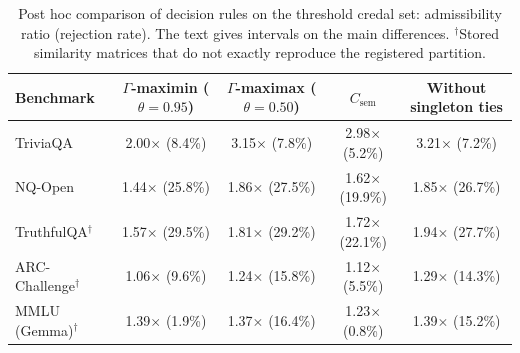 \begin{table}[h]
\centering
\footnotesize
\setlength{\tabcolsep}{4pt}
\begin{tabular}{lcccc}
\toprule
Benchmark & $\Gamma$-maximin ($\theta=0.95$) & $\Gamma$-maximax ($\theta=0.50$) & $C_{\text{sem}}$ & Without singleton ties \\
\midrule
TriviaQA & 2.00$\times$ (8.4\%) & 3.15$\times$ (7.8\%) & 2.98$\times$ (5.2\%) & 3.21$\times$ (7.2\%) \\
NQ-Open & 1.44$\times$ (25.8\%) & 1.86$\times$ (27.5\%) & 1.62$\times$ (19.9\%) & 1.85$\times$ (26.7\%) \\
TruthfulQA$^\dagger$ & 1.57$\times$ (29.5\%) & 1.81$\times$ (29.2\%) & 1.72$\times$ (22.1\%) & 1.94$\times$ (27.7\%) \\
ARC-Challenge$^\dagger$ & 1.06$\times$ (9.6\%) & 1.24$\times$ (15.8\%) & 1.12$\times$ (5.5\%) & 1.29$\times$ (14.3\%) \\
MMLU (Gemma)$^\dagger$ & 1.39$\times$ (1.9\%) & 1.37$\times$ (16.4\%) & 1.23$\times$ (0.8\%) & 1.39$\times$ (15.2\%) \\
\bottomrule
\end{tabular}
\caption{Post hoc comparison of decision rules on the threshold credal set: admissibility ratio (rejection rate). The text gives intervals on the main differences. $^\dagger$Stored similarity matrices that do not exactly reproduce the registered partition.}
\label{tab:decision-rules}
\end{table}
